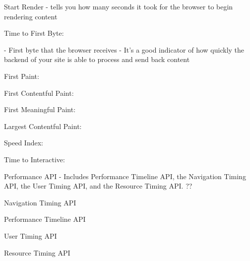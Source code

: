 Start Render %
- tells you how many seconds it took for the browser to begin rendering content


Time to First Byte: %

- First byte that the browser receives
- It’s a good indicator of how quickly the backend of your site is able to process and send back content



First Paint: %


First Contentful Paint: %


First Meaningful Paint: %


Largest Contentful Paint: %


Speed Index: %


Time to Interactive: %
















Performance API %
- Includes Performance Timeline API, the Navigation Timing API, the User Timing API, and the Resource Timing API.  ??



Navigation Timing API %

Performance Timeline API %

User Timing API %

Resource Timing API %



